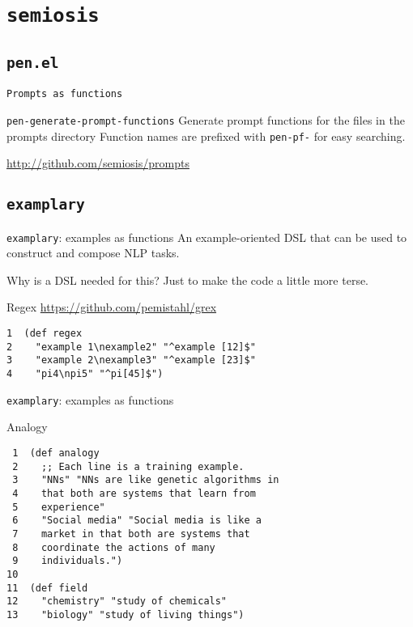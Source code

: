 \documentclass[presentation]{beamer}
\begin{document}
\section{\texttt{semiosis}}
\label{sec:org0054370}
\subsection{\texttt{pen.el}}
\label{sec:org35103e5}
\begin{frame}[label={sec:org3236082},fragile]{\texttt{Prompts as functions}}
 \begin{block}{\texttt{pen-generate-prompt-functions}}
Generate prompt functions for the files in the
prompts directory Function names are prefixed
with \texttt{pen-pf-} for easy searching.

\url{http://github.com/semiosis/prompts}
\end{block}
\end{frame}

\subsection{\texttt{examplary}}
\label{sec:org98ff68b}
\begin{frame}[label={sec:org02c409f},fragile]{\texttt{examplary}: examples as functions}
 An example-oriented DSL that can be used to
construct and compose NLP tasks.

Why is a DSL needed for this? Just to make the
code a little more terse.

\begin{block}{Regex}
\url{https://github.com/pemistahl/grex}

{\footnotesize
\begin{verbatim}
1  (def regex
2    "example 1\nexample2" "^example [12]$"
3    "example 2\nexample3" "^example [23]$"
4    "pi4\npi5" "^pi[45]$")
\end{verbatim}
}
\end{block}
\end{frame}

\begin{frame}[label={sec:orga657232},fragile]{\texttt{examplary}: examples as functions}
 \begin{block}{Analogy}
{\footnotesize
\begin{verbatim}
 1  (def analogy
 2    ;; Each line is a training example.
 3    "NNs" "NNs are like genetic algorithms in
 4    that both are systems that learn from
 5    experience"
 6    "Social media" "Social media is like a
 7    market in that both are systems that
 8    coordinate the actions of many
 9    individuals.")
10  
11  (def field
12    "chemistry" "study of chemicals"
13    "biology" "study of living things")
\end{verbatim}
}
\end{block}
\end{frame}
\end{document}
